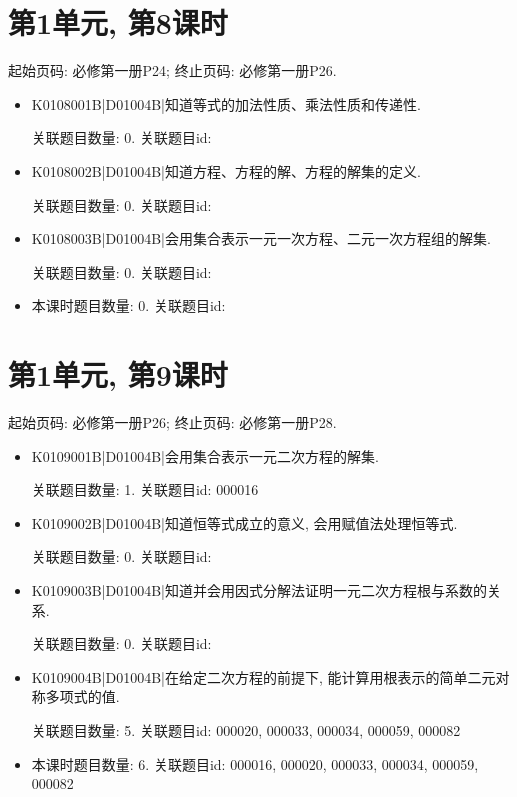 \section*{第1单元, 第8课时}
起始页码: 必修第一册P24; 终止页码: 必修第一册P26.
\begin{itemize}
\item K0108001B|D01004B|知道等式的加法性质、乘法性质和传递性.

关联题目数量: 0. 关联题目id: 

\item K0108002B|D01004B|知道方程、方程的解、方程的解集的定义.

关联题目数量: 0. 关联题目id: 

\item K0108003B|D01004B|会用集合表示一元一次方程、二元一次方程组的解集.

关联题目数量: 0. 关联题目id: 

\item 本课时题目数量: 0. 关联题目id: 

\end{itemize}

\section*{第1单元, 第9课时}
起始页码: 必修第一册P26; 终止页码: 必修第一册P28.
\begin{itemize}
\item K0109001B|D01004B|会用集合表示一元二次方程的解集.

关联题目数量: 1. 关联题目id: 000016

\item K0109002B|D01004B|知道恒等式成立的意义, 会用赋值法处理恒等式.

关联题目数量: 0. 关联题目id: 

\item K0109003B|D01004B|知道并会用因式分解法证明一元二次方程根与系数的关系.

关联题目数量: 0. 关联题目id: 

\item K0109004B|D01004B|在给定二次方程的前提下, 能计算用根表示的简单二元对称多项式的值.

关联题目数量: 5. 关联题目id: 000020, 000033, 000034, 000059, 000082

\item 本课时题目数量: 6. 关联题目id: 000016, 000020, 000033, 000034, 000059, 000082

\end{itemize}

